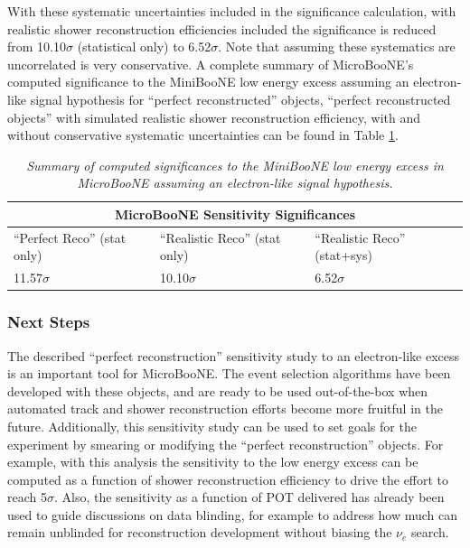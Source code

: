 With these systematic uncertainties included in the significance calculation, with realistic shower reconstruction efficiencies included the significance is reduced from 10.10$\sigma$ (statistical only) to 6.52$\sigma$. Note that assuming these systematics are uncorrelated is very conservative. A complete summary of MicroBooNE's computed significance to the MiniBooNE low energy excess assuming an electron-like signal hypothesis for ``perfect reconstructed'' objects, ``perfect reconstructed objects'' with simulated realistic shower reconstruction efficiency, with and without conservative systematic uncertainties can be found in Table \ref{LEE_final_significance_table}.


\begin{table}
\begin{tabular}{ |p{5cm}|p{5cm}|p{5cm}|  }
 \hline
 \multicolumn{3}{|c|}{MicroBooNE Sensitivity Significances} \\
 \hline
 ``Perfect Reco'' (stat only) & ``Realistic Reco'' (stat only) & ``Realistic Reco'' (stat+sys) \\
 \hline \hline
 11.57$\sigma$ & 10.10$\sigma$ & 6.52$\sigma$\\\hline
 
 \hline
\end{tabular}
\caption{\textit{Summary of computed significances to the MiniBooNE low energy excess in MicroBooNE assuming an electron-like signal hypothesis.}}\label{LEE_final_significance_table}
\end{table}



\subsubsection{Next Steps}
The described ``perfect reconstruction'' sensitivity study to an electron-like excess is an important tool for MicroBooNE. The event selection algorithms have been developed with these objects, and are ready to be used out-of-the-box when automated track and shower reconstruction efforts become more fruitful in the future. Additionally, this sensitivity study can be used to set goals for the experiment by smearing or modifying the ``perfect reconstruction'' objects. For example, with this analysis the sensitivity to the low energy excess can be computed as a function of shower reconstruction efficiency to drive the effort to reach 5$\sigma$. Also, the sensitivity as a function of POT delivered has already been used to guide discussions on data blinding, for example to address how much can remain unblinded for reconstruction development without biasing the $\nu_e$ search.\\


